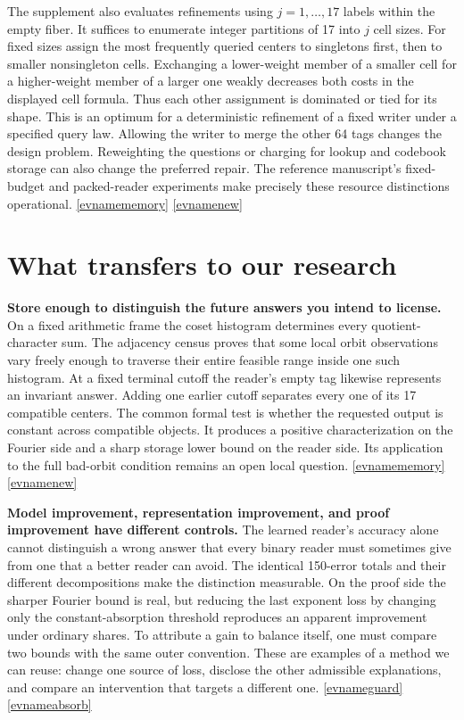 \documentclass[11pt,letterpaper]{article}
\newcommand{\evref}[1]{\hyperlink{ev-#1}{\textsf{\small[\csname evname#1\endcsname]}}}
\begin{document}
The supplement also evaluates refinements using \(j=1,\ldots,17\) labels within the empty fiber. It suffices to enumerate integer partitions of 17 into \(j\) cell sizes. For fixed sizes assign the most frequently queried centers to singletons first, then to smaller nonsingleton cells. Exchanging a lower-weight member of a smaller cell for a higher-weight member of a larger one weakly decreases both costs in the displayed cell formula. Thus each other assignment is dominated or tied for its shape. This is an optimum for a deterministic refinement of a fixed writer under a specified query law. Allowing the writer to merge the other 64 tags changes the design problem. Reweighting the questions or charging for lookup and codebook storage can also change the preferred repair. The reference manuscript's fixed-budget and packed-reader experiments make precisely these resource distinctions operational. \evref{memory} \evref{new}

\section{What transfers to our research}
\label{sec:synthesis}

\textbf{Store enough to distinguish the future answers you intend to license.}
On a fixed arithmetic frame the coset histogram determines every quotient-character sum. The adjacency census proves that some local orbit observations vary freely enough to traverse their entire feasible range inside one such histogram. At a fixed terminal cutoff the reader's empty tag likewise represents an invariant answer. Adding one earlier cutoff separates every one of its 17 compatible centers. The common formal test is whether the requested output is constant across compatible objects. It produces a positive characterization on the Fourier side and a sharp storage lower bound on the reader side. Its application to the full bad-orbit condition remains an open local question. \evref{memory} \evref{new}

\textbf{Model improvement, representation improvement, and proof improvement have different controls.}
The learned reader's accuracy alone cannot distinguish a wrong answer that every binary reader must sometimes give from one that a better reader can avoid. The identical 150-error totals and their different decompositions make the distinction measurable. On the proof side the sharper Fourier bound is real, but reducing the last exponent loss by changing only the constant-absorption threshold reproduces an apparent improvement under ordinary shares. To attribute a gain to balance itself, one must compare two bounds with the same outer convention. These are examples of a method we can reuse: change one source of loss, disclose the other admissible explanations, and compare an intervention that targets a different one. \evref{guard} \evref{absorb}
\end{document}
